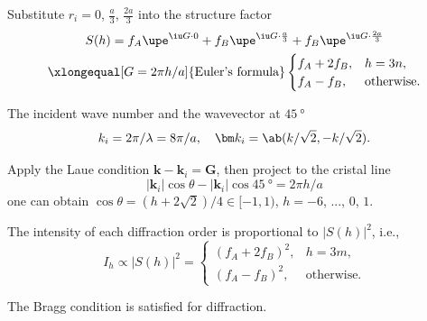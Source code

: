 \begin{solution}\leavevmode
  \begin{enumext}
    \item Substitute $r_i = 0$, $\frac a3$, $\frac{2a}3$ into the
    structure factor
    \begin{multline*}
    S(h) = f_A\upe^{\iu G\cdot 0} + f_B\upe^{\iu G\cdot\frac a3}
         + f_B\upe^{\iu G\cdot\frac{2a}{3}}\\
    \xlongequal[G = 2\pi h/a]{\text{Euler's formula}}
    \begin{cases}
      f_A + 2f_B, & h = 3n,\\
      f_A - f_B,  & \text{otherwise.}
    \end{cases}
    \end{multline*}
    \item The incident wave number and the wavevector at $\qty{45}\degree$
    \[
      k_i = 2\pi/\lambda = 8\pi/a,\quad
      \bm k_i = \ab(k/\sqrt2, -k/\sqrt 2).
    \]
    \begin{minipage}{.64\linewidth}
    Apply the Laue condition $\bm k - \bm k_i = \bm G$, then project to the
    cristal line
    \[
      |\bm k_i|\cos\theta - |\bm k_i|\cos\qty{45}\degree = 2\pi h/a
    \]
    one can obtain $\cos\theta = (h + 2\sqrt2)/4 \in [-1,1)$,
    $h = -6$, ..., $0$, $1$.
    \end{minipage}
    \hfill
    \begin{minipage}{.32\linewidth}
      \centering
    \end{minipage}
    The intensity of each diffraction order is proportional to $|S(h)|^2$, i.e.,
    \[
      I_h \propto |S(h)|^2 =
      \begin{cases}
        (f_A + 2f_B)^2, & h = 3m,\\
        (f_A - f_B)^2,  & \text{otherwise.}
      \end{cases}
    \]
    \item The Bragg condition is satisfied for diffraction.
  \end{enumext}
\end{solution}

